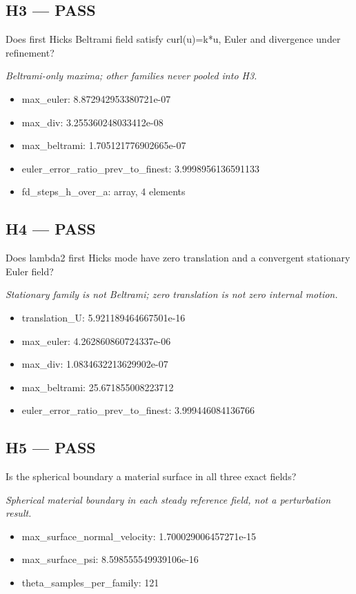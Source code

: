 \documentclass[10pt,a4paper]{article}
\begin{document}
\subsection*{H3 --- PASS}
Does first Hicks Beltrami field satisfy curl(u)=k*u, Euler and divergence under refinement?
\par\textit{Beltrami-only maxima; other families never pooled into H3.}\par
\begin{itemize}
\item max\_euler: 8.872942953380721e-07
\item max\_div: 3.255360248033412e-08
\item max\_beltrami: 1.705121776902665e-07
\item euler\_error\_ratio\_prev\_to\_finest: 3.9998956136591133
\item fd\_steps\_h\_over\_a: array, 4 elements
\end{itemize}
\subsection*{H4 --- PASS}
Does lambda2 first Hicks mode have zero translation and a convergent stationary Euler field?
\par\textit{Stationary family is not Beltrami; zero translation is not zero internal motion.}\par
\begin{itemize}
\item translation\_U: 5.921189464667501e-16
\item max\_euler: 4.262860860724337e-06
\item max\_div: 1.0834632213629902e-07
\item max\_beltrami: 25.671855008223712
\item euler\_error\_ratio\_prev\_to\_finest: 3.999446084136766
\end{itemize}
\subsection*{H5 --- PASS}
Is the spherical boundary a material surface in all three exact fields?
\par\textit{Spherical material boundary in each steady reference field, not a perturbation result.}\par
\begin{itemize}
\item max\_surface\_normal\_velocity: 1.700029006457271e-15
\item max\_surface\_psi: 8.598555549939106e-16
\item theta\_samples\_per\_family: 121
\end{itemize}
\end{document}
